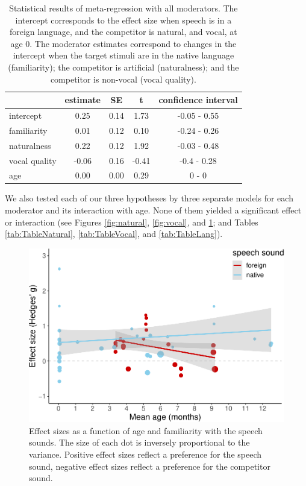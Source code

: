 \documentclass[
  man]{apa6}
\begin{document}
\begin{table}[tbp]
\begin{center}
\begin{threeparttable}
\caption{\label{tab:Table2}Statistical results of meta-regression with all moderators. The intercept corresponds to the effect size when speech is in a foreign language, and the competitor is natural, and vocal, at age 0. The moderator estimates correspond to changes in the intercept when the target stimuli are in the native language (familiarity); the competitor is artificial (naturalness); and the competitor is non-vocal (vocal quality).}
\begin{tabular}{lcccc}
\toprule
 & estimate & SE & t & confidence interval\\
\midrule
intercept & 0.25 & 0.14 & 1.73 & -0.05 - 0.55\\
familiarity & 0.01 & 0.12 & 0.10 & -0.24 - 0.26\\
naturalness & 0.22 & 0.12 & 1.92 & -0.03 - 0.48\\
vocal quality & -0.06 & 0.16 & -0.41 & -0.4 - 0.28\\
age & 0.00 & 0.00 & 0.29 & 0 - 0\\
\bottomrule
\end{tabular}
\end{threeparttable}
\end{center}
\end{table}

We also tested each of our three hypotheses by three separate models for each moderator and its interaction with age. None of them yielded a significant effect or interaction (see Figures \ref{fig:natural}, \ref{fig:vocal}, and \ref{fig:lang}; and Tables \ref{tab:TableNatural}, \ref{tab:TableVocal}, and \ref{tab:TableLang}).

\begin{figure}
\centering
\includegraphics{MA_speech_pref_files/figure-latex/lang-1.pdf}
\caption{\label{fig:lang}Effect sizes as a function of age and familiarity with the speech sounds. The size of each dot is inversely proportional to the variance. Positive effect sizes reflect a preference for the speech sound, negative effect sizes reflect a preference for the competitor sound.}
\end{figure}
\end{document}

